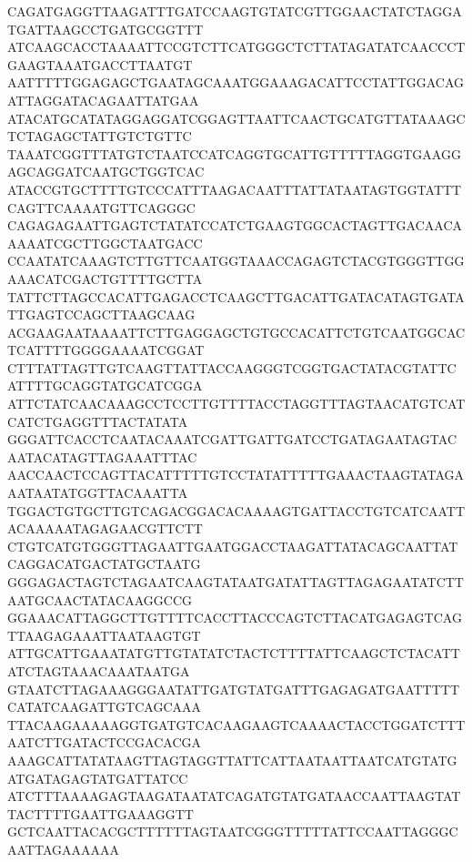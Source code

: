 CAGATGAGGTTAAGATTTGATCCAAGTGTATCGTTGGAACTATCTAGGATGATTAAGCCTGATGCGGTTT
ATCAAGCACCTAAAATTCCGTCTTCATGGGCTCTTATAGATATCAACCCTGAAGTAAATGACCTTAATGT
AATTTTTGGAGAGCTGAATAGCAAATGGAAAGACATTCCTATTGGACAGATTAGGATACAGAATTATGAA
ATACATGCATATAGGAGGATCGGAGTTAATTCAACTGCATGTTATAAAGCTCTAGAGCTATTGTCTGTTC
TAAATCGGTTTATGTCTAATCCATCAGGTGCATTGTTTTTAGGTGAAGGAGCAGGATCAATGCTGGTCAC
ATACCGTGCTTTTGTCCCATTTAAGACAATTTATTATAATAGTGGTATTTCAGTTCAAAATGTTCAGGGC
CAGAGAGAATTGAGTCTATATCCATCTGAAGTGGCACTAGTTGACAACAAAAATCGCTTGGCTAATGACC
CCAATATCAAAGTCTTGTTCAATGGTAAACCAGAGTCTACGTGGGTTGGAAACATCGACTGTTTTGCTTA
TATTCTTAGCCACATTGAGACCTCAAGCTTGACATTGATACATAGTGATATTGAGTCCAGCTTAAGCAAG
ACGAAGAATAAAATTCTTGAGGAGCTGTGCCACATTCTGTCAATGGCACTCATTTTGGGGAAAATCGGAT
CTTTATTAGTTGTCAAGTTATTACCAAGGGTCGGTGACTATACGTATTCATTTTGCAGGTATGCATCGGA
ATTCTATCAACAAAGCCTCCTTGTTTTACCTAGGTTTAGTAACATGTCATCATCTGAGGTTTACTATATA
GGGATTCACCTCAATACAAATCGATTGATTGATCCTGATAGAATAGTACAATACATAGTTAGAAATTTAC
AACCAACTCCAGTTACATTTTTGTCCTATATTTTTGAAACTAAGTATAGAAATAATATGGTTACAAATTA
TGGACTGTGCTTGTCAGACGGACACAAAAGTGATTACCTGTCATCAATTACAAAAATAGAGAACGTTCTT
CTGTCATGTGGGTTAGAATTGAATGGACCTAAGATTATACAGCAATTATCAGGACATGACTATGCTAATG
GGGAGACTAGTCTAGAATCAAGTATAATGATATTAGTTAGAGAATATCTTAATGCAACTATACAAGGCCG
GGAAACATTAGGCTTGTTTTCACCTTACCCAGTCTTACATGAGAGTCAGTTAAGAGAAATTAATAAGTGT
ATTGCATTGAAATATGTTGTATATCTACTCTTTTATTCAAGCTCTACATTATCTAGTAAACAAATAATGA
GTAATCTTAGAAAGGGAATATTGATGTATGATTTGAGAGATGAATTTTTCATATCAAGATTGTCAGCAAA
TTACAAGAAAAAGGTGATGTCACAAGAAGTCAAAACTACCTGGATCTTTAATCTTGATACTCCGACACGA
AAAGCATTATATAAGTTAGTAGGTTATTCATTAATAATTAATCATGTATGATGATAGAGTATGATTATCC
ATCTTTAAAAGAGTAAGATAATATCAGATGTATGATAACCAATTAAGTATTACTTTTGAATTGAAAGGTT
GCTCAATTACACGCTTTTTTAGTAATCGGGTTTTTATTCCAATTAGGGCAATTAGAAAAAA

